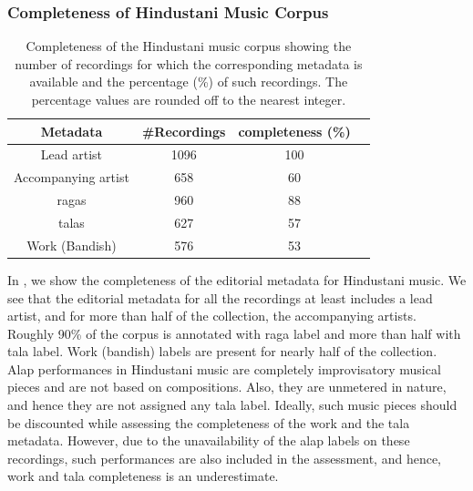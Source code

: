 \subsubsection{Completeness of Hindustani Music Corpus}
\label{sec:corpus_completeness_of_hindustani_music_corpus}

\begin{table}
	\begin{centering}
		\begin{tabular}{ c c c c}
			\hline
			Metadata	 		&  \#Recordings	& completeness (\%)\\
			\hline
			Lead artist			& 	1096	& 	100	\\						
			Accompanying artist	& 	658		& 	60	\\
			\Glspl{raga}		& 	960		& 	88	\\
			\Glspl{tala}		& 	627		& 	57	\\
			Work (Bandish)		& 	576		& 	53	\\
			
			\hline
			
		\end{tabular}
		\par \end{centering}	
	\caption[Completeness of the Hindustani music corpus]{Completeness of the Hindustani music corpus showing the number of recordings for which the corresponding metadata is available and the percentage (\%) of such recordings. The percentage values are rounded off to the nearest integer.} 
	\label{tab:completeness_hindustani_corpus}
\end{table}


In , we show the completeness of the editorial metadata for Hindustani music. We see that the editorial metadata for all the recordings at least includes a lead artist, and for more than half of the collection, the accompanying artists. Roughly 90\% of the corpus is annotated with \gls{raga} label and more than half with \gls{tala} label. Work (bandish) labels are present for nearly half of the collection. \gls{Alap} performances in Hindustani music are completely improvisatory musical pieces and are not based on compositions. Also, they are unmetered in nature, and hence they are not assigned any \gls{tala} label. Ideally, such music pieces should be discounted while assessing the completeness of the work  and the \gls{tala} metadata. However, due to the unavailability of the \gls{alap} labels on these recordings, such performances are also included in the assessment, and hence, work and \gls{tala} completeness is an underestimate.



